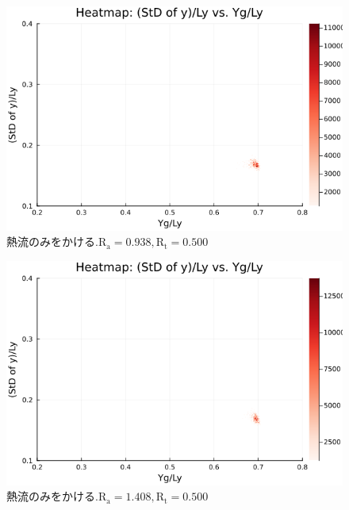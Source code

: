 \begin{figure}[H]
  \centering
  \includegraphics[scale=0.6]{image/g0_heat/2024-01-15T14:07:36.081_mapg0_chiinf_Ay50_rho0.4_T0.43_dT0.04_Rd0.0_Rt0.5_Ra0.938769_g0_run4.0e7.png}
  \caption{$熱流のみをかける. \text{R}_\text{a}=0.938,\text{R}_\text{t}=0.500$}
  \label{}
\end{figure}

\begin{figure}[H]
  \centering
  \includegraphics[scale=0.6]{image/g0_heat/2024-01-15T14:07:36.149_mapg0_chiinf_Ay50_rho0.4_T0.43_dT0.04_Rd0.0_Rt0.5_Ra1.4081535_g0_run4.0e7.png}
  \caption{$熱流のみをかける. \text{R}_\text{a}=1.408,\text{R}_\text{t}=0.500$}
  \label{}
\end{figure}

